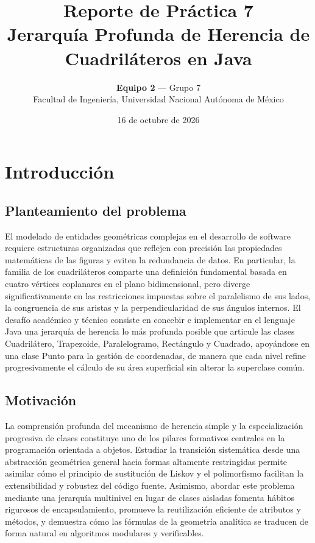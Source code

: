 \documentclass[letterpaper,12pt,oneside]{article}
\title{\textbf{Reporte de Pr\'actica 7}\\\large Jerarqu\'ia Profunda de Herencia de Cuadril\'ateros en Java}
\author{\textbf{Equipo 2} — Grupo 7\\Facultad de Ingenier\'ia, Universidad Nacional Aut\'onoma de M\'exico}
\date{16 de octubre de 2026}
\numberwithin{figure}{section}
\begin{document}


\tableofcontents
\clearpage

\section{Introducci\'on}

\subsection{Planteamiento del problema}
El modelado de entidades geom\'etricas complejas en el desarrollo de software requiere estructuras organizadas que reflejen con precisi\'on las propiedades matem\'aticas de las figuras y eviten la redundancia de datos. En particular, la familia de los cuadril\'ateros comparte una definici\'on fundamental basada en cuatro v\'ertices coplanares en el plano bidimensional, pero diverge significativamente en las restricciones impuestas sobre el paralelismo de sus lados, la congruencia de sus aristas y la perpendicularidad de sus \'angulos internos. El desaf\'io acad\'emico y t\'ecnico consiste en concebir e implementar en el lenguaje Java una jerarqu\'ia de herencia lo m\'as profunda posible que articule las clases Cuadril\'atero, Trapezoide, Paralelogramo, Rect\'angulo y Cuadrado, apoy\'andose en una clase Punto para la gesti\'on de coordenadas, de manera que cada nivel refine progresivamente el c\'alculo de su \'area superficial sin alterar la superclase com\'un.

\subsection{Motivaci\'on}
La comprensi\'on profunda del mecanismo de herencia simple y la especializaci\'on progresiva de clases constituye uno de los pilares formativos centrales en la programaci\'on orientada a objetos. Estudiar la transici\'on sistem\'atica desde una abstracci\'on geom\'etrica general hacia formas altamente restringidas permite asimilar c\'omo el principio de sustituci\'on de Liskov y el polimorfismo facilitan la extensibilidad y robustez del c\'odigo fuente. Asimismo, abordar este problema mediante una jerarqu\'ia multinivel en lugar de clases aisladas fomenta h\'abitos rigurosos de encapsulamiento, promueve la reutilizaci\'on eficiente de atributos y m\'etodos, y demuestra c\'omo las f\'ormulas de la geometr\'ia anal\'itica se traducen de forma natural en algoritmos modulares y verificables.
\end{document}
